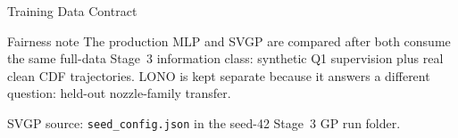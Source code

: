 \documentclass[UTF8,aspectratio=169]{ctexbeamer}
\begin{document}
\begin{frame}{Training Data Contract}
\small
\begin{center}
\renewcommand{\arraystretch}{1.16}
\setlength{\tabcolsep}{3pt}
\end{center}

\vspace{0.6em}
\begin{block}{Fairness note}
The production MLP and SVGP are compared after both consume the same full-data Stage~3
information class: synthetic Q1 supervision plus real clean CDF trajectories. LONO is kept
separate because it answers a different question: held-out nozzle-family transfer.
\end{block}

\vspace{0.25em}
\footnotesize
SVGP source: \texttt{seed\_config.json} in the seed-42 Stage~3 GP run folder.
\end{frame}
\end{document}

